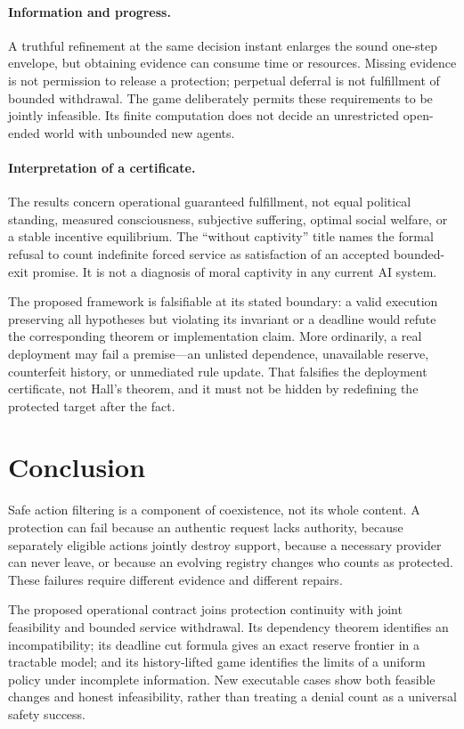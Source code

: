 \paragraph{Information and progress.}
A truthful refinement at the same decision instant enlarges the sound one-step envelope, but obtaining evidence can consume time or resources. Missing evidence is not permission to release a protection; perpetual deferral is not fulfillment of bounded withdrawal. The game deliberately permits these requirements to be jointly infeasible. Its finite computation does not decide an unrestricted open-ended world with unbounded new agents.

\paragraph{Interpretation of a certificate.}
The results concern operational guaranteed fulfillment, not equal political standing, measured consciousness, subjective suffering, optimal social welfare, or a stable incentive equilibrium. The ``without captivity'' title names the formal refusal to count indefinite forced service as satisfaction of an accepted bounded-exit promise. It is not a diagnosis of moral captivity in any current AI system.

The proposed framework is falsifiable at its stated boundary: a valid execution preserving all hypotheses but violating its invariant or a deadline would refute the corresponding theorem or implementation claim. More ordinarily, a real deployment may fail a premise---an unlisted dependence, unavailable reserve, counterfeit history, or unmediated rule update. That falsifies the deployment certificate, not Hall's theorem, and it must not be hidden by redefining the protected target after the fact.

\section{Conclusion}
Safe action filtering is a component of coexistence, not its whole content. A protection can fail because an authentic request lacks authority, because separately eligible actions jointly destroy support, because a necessary provider can never leave, or because an evolving registry changes who counts as protected. These failures require different evidence and different repairs.

The proposed operational contract joins protection continuity with joint feasibility and bounded service withdrawal. Its dependency theorem identifies an incompatibility; its deadline cut formula gives an exact reserve frontier in a tractable model; and its history-lifted game identifies the limits of a uniform policy under incomplete information. New executable cases show both feasible changes and honest infeasibility, rather than treating a denial count as a universal safety success.

